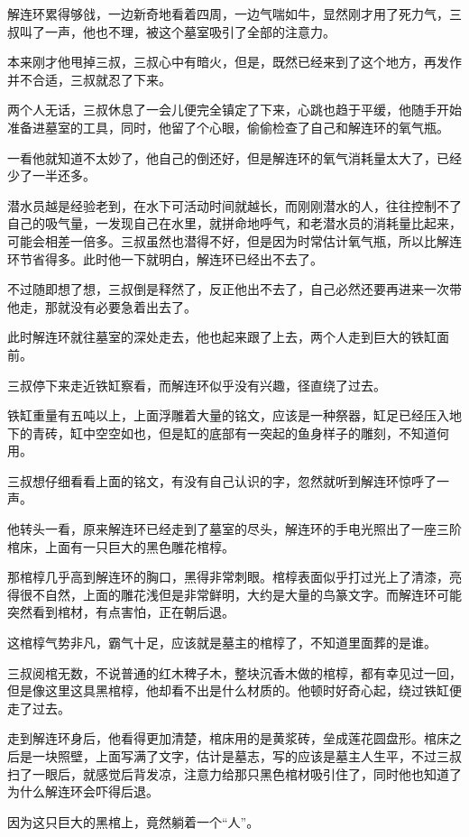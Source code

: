 解连环累得够戗，一边新奇地看着四周，一边气喘如牛，显然刚才用了死力气，三叔叫了一声，他也不理，被这个墓室吸引了全部的注意力。

本来刚才他甩掉三叔，三叔心中有暗火，但是，既然已经来到了这个地方，再发作并不合适，三叔就忍了下来。

两个人无话，三叔休息了一会儿便完全镇定了下来，心跳也趋于平缓，他随手开始准备进墓室的工具，同时，他留了个心眼，偷偷检查了自己和解连环的氧气瓶。

一看他就知道不太妙了，他自己的倒还好，但是解连环的氧气消耗量太大了，已经少了一半还多。

潜水员越是经验老到，在水下可活动时间就越长，而刚刚潜水的人，往往控制不了自己的吸气量，一发现自己在水里，就拼命地呼气，和老潜水员的消耗量比起来，可能会相差一倍多。三叔虽然也潜得不好，但是因为时常估计氧气瓶，所以比解连环节省得多。此时他一下就明白，解连环已经出不去了。

不过随即想了想，三叔倒是释然了，反正他出不去了，自己必然还要再进来一次带他走，那就没有必要急着出去了。

此时解连环就往墓室的深处走去，他也起来跟了上去，两个人走到巨大的铁缸面前。

三叔停下来走近铁缸察看，而解连环似乎没有兴趣，径直绕了过去。

铁缸重量有五吨以上，上面浮雕着大量的铭文，应该是一种祭器，缸足已经压入地下的青砖，缸中空空如也，但是缸的底部有一突起的鱼身样子的雕刻，不知道何用。

三叔想仔细看看上面的铭文，有没有自己认识的字，忽然就听到解连环惊呼了一声。

他转头一看，原来解连环已经走到了墓室的尽头，解连环的手电光照出了一座三阶棺床，上面有一只巨大的黑色雕花棺椁。

那棺椁几乎高到解连环的胸口，黑得非常刺眼。棺椁表面似乎打过光上了清漆，亮得很不自然，上面的雕花浅但是非常鲜明，大约是大量的鸟篆文字。而解连环可能突然看到棺材，有点害怕，正在朝后退。

这棺椁气势非凡，霸气十足，应该就是墓主的棺椁了，不知道里面葬的是谁。

三叔阅棺无数，不说普通的红木稗子木，整块沉香木做的棺椁，都有幸见过一回，但是像这里这具黑棺椁，他却看不出是什么材质的。他顿时好奇心起，绕过铁缸便走了过去。

走到解连环身后，他看得更加清楚，棺床用的是黄浆砖，垒成莲花圆盘形。棺床之后是一块照壁，上面写满了文字，估计是墓志，写的应该是墓主人生平，不过三叔扫了一眼后，就感觉后背发凉，注意力给那只黑色棺材吸引住了，同时他也知道了为什么解连环会吓得后退。

因为这只巨大的黑棺上，竟然躺着一个“人”。

